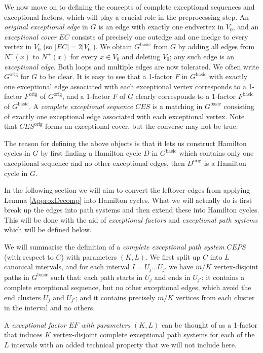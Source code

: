 \documentclass[10pt,letterpaper, reqno]{amsart}
\theoremstyle{definition}
\numberwithin{equation}{section}
\begin{document}
We now move on to defining the concepts of complete exceptional sequences and exceptional factors, which will play a crucial role in the preprocessing step. An \textit{original exceptional edge} in $G$ is an edge with exactly one endvertex in $V_0$, and an \textit{exceptional cover} $EC$ consists of precisely one outedge and one inedge to every vertex in $V_0$ (so $|EC|=2|V_0|$). We obtain $G^\text{basic}$ from $G$ by adding all edges from $N^-(x)$ to $N^+(x)$ for every $x \in V_0$ and deleting $V_0$; any such edge is an \textit{exceptional edge}. Both loops and multiple edges are now tolerated. We often write $G^\text{orig}$ for $G$ to be clear. It is easy to see that a 1-factor $F$ in $G^\text{basic}$ with exactly one exceptional edge associated with each exceptional vertex corresponds to a 1-factor $F^\text{orig}$ of $G^\text{orig}$, and a 1-factor $F$ of $G$ clearly corresponds to a 1-factor $F^\text{basic}$ of $G^\text{basic}$. A \textit{complete exceptional sequence $CES$} is a matching in $G^\text{basic}$ consisting of exactly one exceptional edge associated with each exceptional vertex. Note that $CES^\text{orig}$ forms an exceptional cover, but the converse may not be true.

The reason for defining the above objects is that it lets us construct Hamilton cycles in $G$ by first finding a Hamilton cycle $D$ in $G^\text{basic}$ which contains only one exceptional sequence and no other exceptional edges, then $D^\text{orig}$ is a Hamilton cycle in $G$. 

In the following section we will aim to convert the leftover edges from applying Lemma \ref{ApproxDecomp} into Hamilton cycles. What we will actually do is first break up the edges into path systems and then extend these into Hamilton cycles. This will be done with the aid of \textit{exceptional factors} and \textit{exceptional path systems} which will be defined below. 

We will summarise the definition of a \textit{complete exceptional path system} $CEPS$ (with respect to $C$) with parameters $(K,L)$. We first split up $C$ into $L$ canonical intervals, and for each interval $I=U_j\dots U_{j'}$  we have $m/K$ vertex-disjoint paths in $G^\text{basic}$ such that: each path starts in $U_j$ and ends in $U_{j'}$; it contains a complete exceptional sequence, but no other exceptional edges, which avoid the end clusters $U_j$ and $U_{j'}$; and it contains precisely $m/K$ vertices from each cluster in the interval and no others. 

A \textit{exceptional factor $EF$ with parameters $(K,L)$} can be thought of as a 1-factor that induces $K$ vertex-disjoint complete exceptional path systems for each of the $L$ intervals with an added technical property that we will not include here. 
\end{document}

